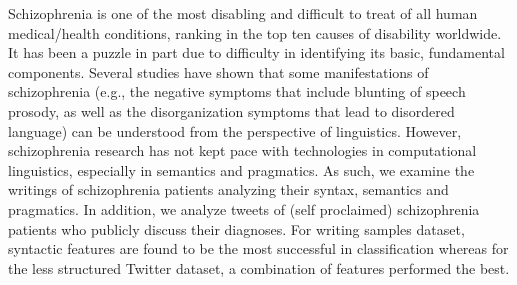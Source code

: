Schizophrenia is one of the most disabling and difficult to treat of all human medical/health conditions, ranking in the top ten causes of disability worldwide. It has been a puzzle in part due to difficulty in identifying its basic, fundamental components. Several studies have shown that some manifestations of schizophrenia (e.g., the negative symptoms that include blunting of speech prosody, as well as the disorganization symptoms that lead to disordered language) can be understood from the perspective of linguistics. However, schizophrenia research has not kept pace with technologies in computational linguistics, especially in semantics and pragmatics. As such, we examine the writings of schizophrenia patients analyzing their syntax, semantics and pragmatics. In addition, we analyze tweets of (self proclaimed) schizophrenia patients who publicly discuss their diagnoses. For writing samples dataset, syntactic features are found to be the most successful in classification whereas for the less structured Twitter dataset, a combination of  features performed the best.
